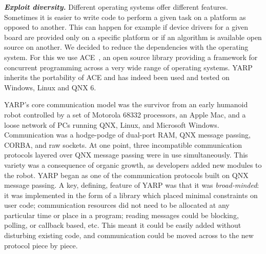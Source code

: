 %
%
\textit{\textbf{Exploit diversity.}}
%
Different operating systems offer different
features. Sometimes it is easier to write code to perform a given task
on a platform as opposed to another. This can happen for example if 
device drivers for a given board are provided only on a specific platform or
if an algorithm is available open source on another. We decided to reduce the
dependencies with the operating system. For this we
use ACE~\cite{ACEBook}, an open source library providing a framework for
concurrent programming across a very wide range of operating
systems. YARP inherits the portability of ACE and has indeed been used and
tested on Windows, Linux and QNX 6.



YARP's core communication model was the survivor from an early humanoid robot
controlled by a set of Motorola 68332 processors, an Apple Mac, and a loose network
of PCs running QNX, Linux, and Microsoft Windows.  Communication was a
hodge-podge of dual-port RAM, QNX message passing, CORBA, and raw
sockets.  At one point, three incompatible communication protocols
layered over QNX message passing were in use simultaneously.  This
variety was a consequence of organic growth, as developers added new
modules to the robot.  YARP began as one of the communication
protocols built on QNX message passing.  A key, defining, feature of
YARP was that it was {\em broad-minded}: it was
implemented in the form of a library which placed minimal constraints
on user code; communication resources did not need to be allocated at
any particular time or place in a program; reading messages could be
blocking, polling, or callback based, etc. This meant it could be
easily added without disturbing existing code, and communication could
be moved across to the new protocol piece by piece.

%


